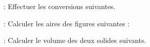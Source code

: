  : Effectuer les conversions suivantes.

 : Calculer les aires des figures suivantes :

 : Calculer le volume des deux solides suivants.



